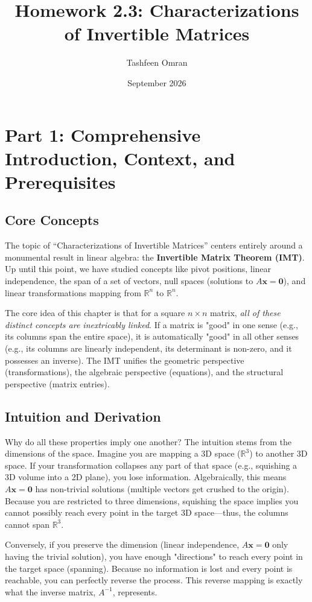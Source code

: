 \documentclass[12pt]{article}
\title{Homework 2.3: Characterizations of Invertible Matrices}
\author{Tashfeen Omran}
\date{September 2026}
\begin{document}
\maketitle

\section{Part 1: Comprehensive Introduction, Context, and Prerequisites}

\subsection{Core Concepts}
The topic of ``Characterizations of Invertible Matrices'' centers entirely around a monumental result in linear algebra: the \textbf{Invertible Matrix Theorem (IMT)}. Up until this point, we have studied concepts like pivot positions, linear independence, the span of a set of vectors, null spaces (solutions to $A\mathbf{x} = \mathbf{0}$), and linear transformations mapping from $\mathbb{R}^n$ to $\mathbb{R}^n$. 

The core idea of this chapter is that for a square $n \times n$ matrix, \emph{all of these distinct concepts are inextricably linked}. If a matrix is "good" in one sense (e.g., its columns span the entire space), it is automatically "good" in all other senses (e.g., its columns are linearly independent, its determinant is non-zero, and it possesses an inverse). The IMT unifies the geometric perspective (transformations), the algebraic perspective (equations), and the structural perspective (matrix entries).

\subsection{Intuition and Derivation}
Why do all these properties imply one another? The intuition stems from the dimensions of the space. Imagine you are mapping a 3D space ($\mathbb{R}^3$) to another 3D space. 
If your transformation collapses any part of that space (e.g., squishing a 3D volume into a 2D plane), you lose information. Algebraically, this means $A\mathbf{x} = \mathbf{0}$ has non-trivial solutions (multiple vectors get crushed to the origin). Because you are restricted to three dimensions, squishing the space implies you cannot possibly reach every point in the target 3D space—thus, the columns cannot span $\mathbb{R}^3$. 

Conversely, if you preserve the dimension (linear independence, $A\mathbf{x} = \mathbf{0}$ only having the trivial solution), you have enough "directions" to reach every point in the target space (spanning). Because no information is lost and every point is reachable, you can perfectly reverse the process. This reverse mapping is exactly what the inverse matrix, $A^{-1}$, represents. 
\end{document}
